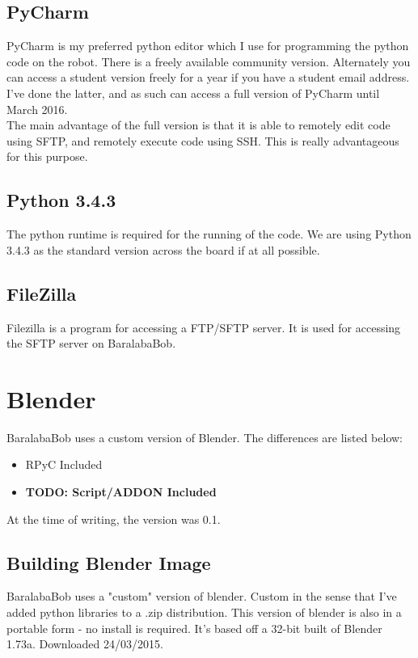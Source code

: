 			\subsection{PyCharm}
				PyCharm is my preferred python editor which I use for programming the python code on the robot. There is a freely available community version. Alternately you can access a student version freely for a year if you have a student email address. I’ve done the latter, and as such can access a full version of PyCharm until March 2016.\\
				
				The main advantage of the full version is that it is able to remotely edit code using SFTP, and remotely execute code using SSH. This is really advantageous for this purpose.
				
			\subsection{Python 3.4.3}
				The python runtime is required for the running of the code. We are using Python 3.4.3 as the standard version across the board if at all possible.
			
			\subsection{FileZilla}
				Filezilla is a program for accessing a FTP/SFTP server. It is used for accessing the SFTP server on BaralabaBob.
				\pagebreak
			
	
		\section{Blender}
        \label{manual_blender}
		BaralabaBob uses a custom version of Blender. The differences are listed below:
		
			\begin{itemize}
				\item RPyC Included
				\item \textbf{TODO: Script/ADDON Included}
			\end{itemize}
			
			At the time of writing, the version was 0.1.					
	
			\subsection{Building Blender Image}
				BaralabaBob uses a "custom" version of blender. Custom in the sense that I've added python libraries to a .zip distribution. This version of blender is also in a portable form - no install is required. It's based off a 32-bit built of Blender 1.73a. Downloaded 24/03/2015.
							
